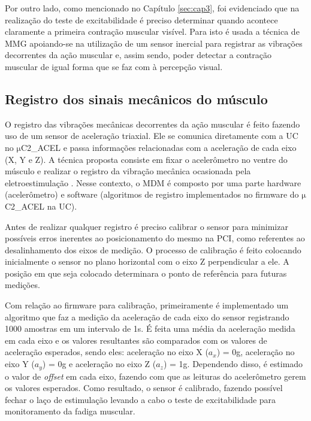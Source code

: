 Por outro lado, como mencionado no Capítulo \ref{sec:cap3}, foi evidenciado que na realização do teste de excitabilidade é preciso determinar quando acontece claramente a primeira contração muscular visível. Para isto é usada a técnica de \acrshort{MMG} apoiando-se na utilização de um sensor inercial para registrar as vibrações decorrentes da ação muscular e, assim sendo, poder detectar a contração muscular de igual forma que se faz com à percepção visual.


\subsection*{Registro dos sinais mecânicos do músculo}

O registro das vibrações mecânicas decorrentes da ação muscular é feito fazendo uso de um sensor de aceleração triaxial. Ele se comunica diretamente com a \acrshort{UC} no $\mathrm{\mu}$C2\_ACEL e passa informações relacionadas com a aceleração de cada eixo (X, Y e Z). A técnica proposta consiste em fixar o acelerômetro no ventre do músculo e realizar o registro da vibração mecânica ocasionada pela eletroestimulação \cite{Faller2009}. Nesse contexto, o \acrshort{MDM} é composto por uma parte hardware (acelerômetro) e software (algoritmos de registro implementados no firmware do $\mathrm{\mu}$C2\_ACEL na \acrshort{UC}). 
 
Antes de realizar qualquer registro é preciso calibrar o sensor para minimizar possíveis erros inerentes ao posicionamento do mesmo na \acrshort{PCI}, como referentes ao desalinhamento dos eixos de medição. O processo de calibração é feito colocando inicialmente o sensor no plano horizontal com o eixo Z perpendicular a ele. A posição em que seja colocado determinara o ponto de referência para futuras medições. 

Com relação ao firmware para calibração, primeiramente é implementado um algoritmo que faz a medição da aceleração de cada eixo do sensor registrando 1000 amostras em um intervalo de 1s. É feita uma média da aceleração medida em cada eixo e os valores resultantes são comparados com os valores de aceleração esperados, sendo eles: aceleração no eixo X ($a_x$) = 0g, aceleração no eixo Y ($a_y$) = 0g e aceleração no eixo Z ($a_z$) = 1g. Dependendo disso, é estimado o valor de \textit{offset} em cada eixo, fazendo com que as leituras do acelerômetro gerem os valores esperados. Como resultado, o sensor é calibrado, fazendo possível fechar o laço de estimulação levando a cabo o teste de excitabilidade para monitoramento da fadiga muscular. 

